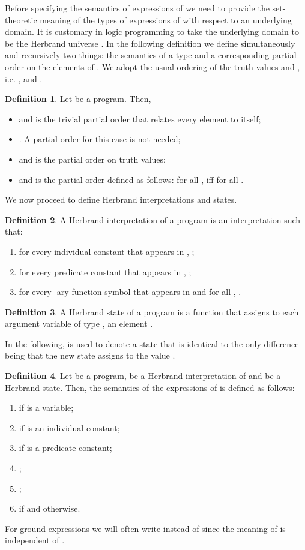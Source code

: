 \documentclass[submission,copyright]{eptcs}
\theoremstyle{definition}
\newtheorem{definition}{Definition}
\begin{document}
Before specifying the semantics of expressions of  we need to
provide the set-theoretic meaning of the types of expressions of
 with respect to an underlying domain. It is customary in
logic programming to take the underlying domain to be the Herbrand
universe . In the following definition we define
simultaneously and recursively two things: the semantics 
of a type  and a corresponding partial order 
on the elements of . We adopt the usual ordering of the truth values
 and , i.e. ,
 and .
\begin{definition}
Let  be a program. Then,
\begin{itemize}
  \item  and  is the trivial partial order
        that relates every element to itself;
  \item . A partial order for this case is not needed;
  \item  and  is the partial order  on truth values;
\item  and 
  is the partial order defined as follows: for all ,
   iff  for all .
\end{itemize}
\end{definition}
We now proceed to define Herbrand interpretations and states.
\begin{definition}
A Herbrand interpretation  of a program  is an interpretation such that:
\begin{enumerate}
  \item for every individual constant  that appears in , ;
  \item for every predicate constant  that appears in , ;
  \item for every -ary function symbol  that appears in  and for all
  , .
\end{enumerate}
\end{definition}

\begin{definition}
  A Herbrand state  of a program  is a function that assigns to each argument variable 
  of type , an element .
\end{definition}
In the following,  is used to denote a state that is identical to  the
only difference being that the new state assigns to  the value .

\begin{definition}
  Let  be a program,  be a Herbrand interpretation of  and
   be a Herbrand state. Then, the semantics of the expressions of  is
  defined as follows:
\begin{enumerate}
  \item  if  is a variable;
  \item  if  is an individual constant;
  \item  if  is a predicate constant;
  \item ;
  \item ;
  \item  if  and  otherwise.
\end{enumerate}
\end{definition}
For ground expressions  we will often write  instead
of  since the meaning of  is independent of .
\end{document}
